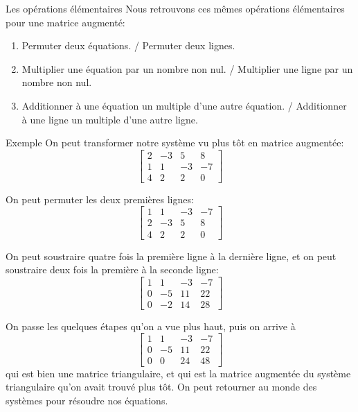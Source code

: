 \documentclass{article}
\begin{document}
\begin{parag}{Les opérations élémentaires}
    Nous retrouvons ces mêmes opérations élémentaires pour une matrice augmenté:
    \begin{enumerate}
        \item Permuter deux équations. / Permuter deux lignes.
        \item Multiplier une équation par un nombre non nul. / Multiplier une ligne par un nombre non nul.
        \item Additionner à une équation un multiple d'une autre équation. / Additionner à une ligne un multiple d'une autre ligne.
    \end{enumerate}
\end{parag}

\begin{parag}{Exemple}
    On peut transformer notre système vu plus tôt en matrice augmentée:
    \[\begin{bmatrix} 2 & -3 & 5 & 8 \\ 1 & 1 & -3 & -7 \\ 4 & 2 & 2 & 0 \end{bmatrix} \]

    On peut permuter les deux premières lignes:
    \[\begin{bmatrix} 1 & 1 & -3 & -7 \\ 2 & -3 & 5 & 8 \\ 4 & 2 & 2 & 0 \end{bmatrix} \]

    On peut soustraire quatre fois la première ligne à la dernière ligne, et on peut soustraire deux fois la première à la seconde ligne:
\[\begin{bmatrix} 1 & 1 & -3 & -7 \\ 0 & -5 & 11 & 22 \\ 0 & -2 & 14 & 28 \end{bmatrix} \]

    On passe les quelques étapes qu'on a vue plus haut, puis on arrive à
\[\begin{bmatrix} 1 & 1 & -3 & -7 \\ 0 & -5 & 11 & 22 \\ 0 & 0 & 24 & 48 \end{bmatrix}\]
    qui est bien une matrice triangulaire, et qui est la matrice augmentée du système triangulaire qu'on avait trouvé plus tôt. On peut retourner au monde des systèmes pour résoudre nos équations.
\end{parag}
\end{document}

